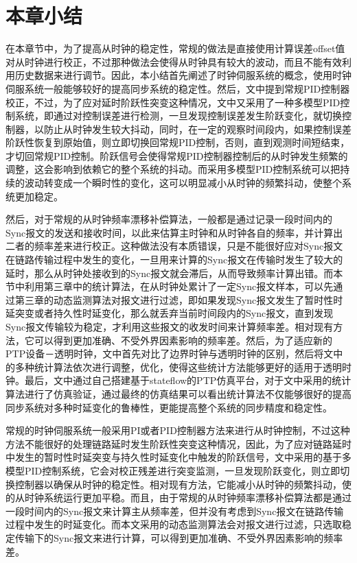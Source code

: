 \section{本章小结}
在本章节中，为了提高从时钟的稳定性，常规的做法是直接使用计算误差offset值对从时钟进行校正，不过那种做法会使得从时钟具有较大的波动，而且不能有效利用历史数据来进行调节。因此，本小结首先阐述了时钟伺服系统的概念，使用时钟伺服系统一般能够较好的提高同步系统的稳定性。然后，文中提到常规PID控制器校正，不过，为了应对延时阶跃性突变这种情况，文中又采用了一种多模型PID控制系统，即通过对控制误差进行检测，一旦发现控制误差发生阶跃变化，就切换控制器，以防止从时钟发生较大抖动，同时，在一定的观察时间段内，如果控制误差阶跃性恢复到原始值，则立即切换回常规PID控制，否则，直到观测时间短结束，才切回常规PID控制。阶跃信号会使得常规PID控制器控制后的从时钟发生频繁的调整，这会影响到依赖它的整个系统的抖动。而采用多模型PID控制系统可以把持续的波动转变成一个瞬时性的变化，这可以明显减小从时钟的频繁抖动，使整个系统更加稳定。

然后，对于常规的从时钟频率漂移补偿算法，一般都是通过记录一段时间内的Sync报文的发送和接收时间，以此来估算主时钟和从时钟各自的频率，并计算出二者的频率差来进行校正。这种做法没有本质错误，只是不能很好应对Sync报文在链路传输过程中发生的变化，一旦用来计算的Sync报文在传输时发生了较大的延时，那么从时钟处接收到的Sync报文就会滞后，从而导致频率计算出错。而本节中利用第三章中的统计算法，在从时钟处累计了一定Sync报文样本，可以先通过第三章的动态监测算法对报文进行过滤，即如果发现Sync报文发生了暂时性时延突变或者持久性时延变化，那么就丢弃当前时间段内的Sync报文，直到发现Sync报文传输较为稳定，才利用这些报文的收发时间来计算频率差。相对现有方法，它可以得到更加准确、不受外界因素影响的频率差。然后，为了适应新的PTP设备－透明时钟，文中首先对比了边界时钟与透明时钟的区别，然后将文中的多种统计算法依次进行调整，优化，使得这些统计方法能够更好的适用于透明时钟。最后，文中通过自己搭建基于stateflow的PTP仿真平台，对于文中采用的统计算法进行了仿真验证，通过最终的仿真结果可以看出统计算法不仅能够很好的提高同步系统对多种时延变化的鲁棒性，更能提高整个系统的同步精度和稳定性。

常规的时钟伺服系统一般采用PI或者PID控制器方法来进行从时钟控制，不过这种方法不能很好的处理链路延时发生阶跃性突变这种情况，因此，为了应对链路延时中发生的暂时性时延突变与持久性时延变化中触发的阶跃信号，文中采用的基于多模型PID控制系统，它会对校正残差进行突变监测，一旦发现阶跃变化，则立即切换控制器以确保从时钟的稳定性。相对现有方法，它能减小从时钟的频繁抖动，使的从时钟系统运行更加平稳。而且，由于常规的从时钟频率漂移补偿算法都是通过一段时间内的Sync报文来计算主从频率差，但并没有考虑到Sync报文在链路传输过程中发生的时延变化。而本文采用的动态监测算法会对报文进行过滤，只选取稳定传输下的Sync报文来进行计算，可以得到更加准确、不受外界因素影响的频率差。



